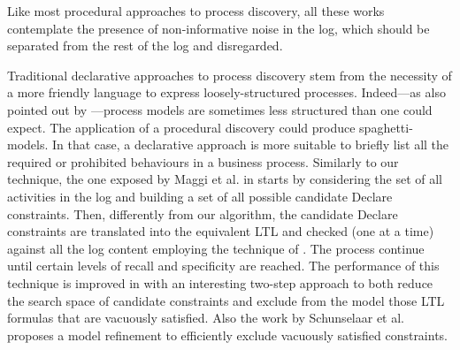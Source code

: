 Like most procedural approaches to process discovery, all these works contemplate the presence of non-informative noise in the log, which should be separated from the rest of the log and disregarded.
 
Traditional declarative approaches to process discovery stem from the necessity of a more friendly language to express loosely-structured processes. Indeed---as also pointed out by \cite{2012-Maggi}---process models are sometimes less structured than one could expect. The application of a procedural discovery could produce spaghetti-models. In that case, a declarative approach is more suitable to briefly list all the required or prohibited behaviours in a business process.
Similarly to our technique, the one exposed by Maggi et al. in \cite{2011-Maggi} starts by considering the set of all activities in the log and building a set of all possible candidate Declare constraints. 
Then, differently from our algorithm, the candidate Declare constraints are translated into the equivalent \ac{LTL} and checked (one at a time) against all the log content employing the technique of \cite{2005-Aalst}. The process continue until certain levels of recall and specificity are reached. The performance of this technique is improved in \cite{2012-Maggi} with an interesting two-step approach to both reduce the search space of candidate constraints and exclude from the model those \ac{LTL} formulas that are vacuously satisfied.
Also the work \cite{2012-Schunselaar} by Schunselaar et al. proposes a model refinement to efficiently exclude vacuously satisfied constraints. 

